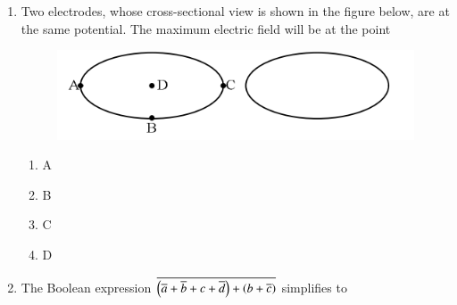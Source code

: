 \documentclass[journal,12pt,onecolumn]{IEEEtran}
\theoremstyle{remark}
\begin{document}
\begin{enumerate}[start=1, label=Q.\arabic*]
    \hfill{}

    \item Two electrodes, whose cross-sectional view is shown in the figure below, are at the same potential. The maximum electric field will be at the point
    \begin{figure}[H]
        \includegraphics[width=0.4\columnwidth]{Figures/2q25.png}
        \centering
        \caption{}
    \end{figure}
    \begin{enumerate}
        \item A
        \item B
        \item C
        \item D
    \end{enumerate}

    \hfill{}

    \item The Boolean expression $\overline{\left(\overline{a} + \overline{b} + c + \overline{d}\right) + \left(b+\overline{c}\right)}$ simplifies to
    \begin{enumerate}
    \end{enumerate}

    \hfill{}


\end{enumerate}
\end{document}
